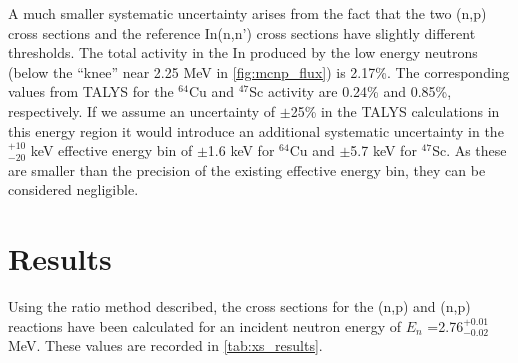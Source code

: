\documentclass[5p]{elsarticle}
\newcommand{\comment}[1]{\todo[color=blue!20!white,inline]{ASV: #1}}
\begin{document}
A much smaller systematic uncertainty arises from the fact that the two (n,p) cross sections and the reference In(n,n') cross sections have slightly different thresholds.  
The total activity in the In produced by the low energy neutrons (below the \enquote{knee} near 2.25 MeV in  \autoref{fig:mcnp_flux}) is 2.17\%.  
The corresponding values from TALYS for the $^{64}$Cu and $^{47}$Sc activity are 0.24\% and 0.85\%, respectively.  
If we assume an uncertainty of $\pm$25\% in the TALYS calculations in this energy region it would introduce an additional systematic uncertainty in the $^{+10}_{-20}$ keV effective energy bin of $\pm$1.6 keV for $^{64}$Cu and $\pm$5.7 keV for $^{47}$Sc. 
As these are smaller than the precision of the existing effective energy bin, they can be considered negligible.













\section{Results}


Using the ratio method described, the cross sections for the (n,p) and (n,p) reactions have been calculated for an incident neutron energy of $E_n$ =2.76$^{+0.01}_{-0.02}$ MeV.
These values are recorded in \autoref{tab:xs_results}.



\end{document}
